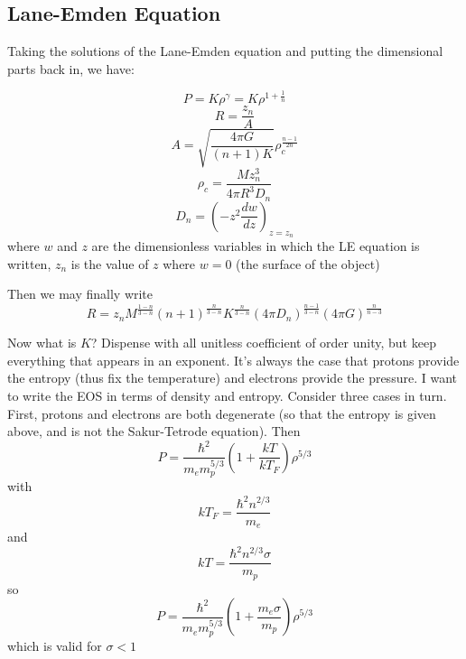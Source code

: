 \documentclass{emulateapj}
\begin{document}
\subsection{Lane-Emden Equation}
Taking the solutions of the Lane-Emden equation and putting the
dimensional parts back in, we have:

\begin{equation}
  P = K \rho ^\gamma = K \rho^{1+\frac{1}{n}}
\end{equation}
\begin{equation}
  R = \frac{z_n}{A}  
\end{equation}
\begin{equation}
  A = \sqrt{\frac{4\pi G}{(n+1) K}}\rho_c^{\frac{n-1}{2n}}
\end{equation}
\begin{equation}
  \rho_c = \frac{M z_n^3}{4\pi R^3 D_n}
\end{equation}
\begin{equation}
  D_n = \left( -z^2 \frac{dw}{dz}\right)_{z=z_n}
\end{equation}
where $w$ and $z$ are the dimensionless variables in which the LE
equation is written, $z_n$ is the value of $z$ where $w=0$ (the
surface of the object)

Then we may finally write 
\begin{equation}
  R = z_n 
  M^{\frac{1-n}{3-n}}
  (n+1)^{\frac{n}{3-n}}
  K^{\frac{n}{3-n}}
  (4 \pi D_n)^{\frac{n-1}{3-n}}
  (4 \pi G)^{\frac{n}{n-3}}
\end{equation}

Now what is $K$?  Dispense with all unitless coefficient of order
unity, but keep everything that appears in an exponent.  It's always
the case that protons provide the entropy (thus fix the temperature)
and electrons provide the pressure.  I want to write the EOS in terms
of density and entropy.  Consider three cases in turn.  First, protons
and electrons are both degenerate (so that the entropy is given above,
and is not the Sakur-Tetrode equation).  Then
\begin{equation}
  P = \frac{\hbar^2}{m_e m_p^{5/3}} \left( 1+\frac{kT}{kT_F} \right) \rho^{5/3} 
\end{equation}
with 
\begin{equation}
  k T_F = \frac{\hbar^2 n^{2/3}}{m_e}
\end{equation}
and 
\begin{equation}
  kT = \frac{\hbar^2 n^{2/3} \sigma}{m_p}
\end{equation}
so 
\begin{equation}
  P = \frac{\hbar^2}{m_e m_p^{5/3}}
\left(1 + \frac{m_e \sigma}{m_p} \right)
\rho^{5/3}
\end{equation}
which is valid for $\sigma < 1$
\end{document}
